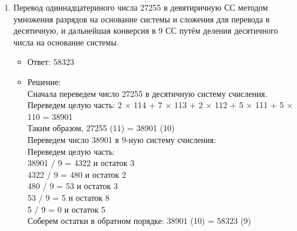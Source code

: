 \documentclass[14pt,final,oneside]{extreport}%
\begin{document}
\begin{enumerate}
        \item Перевод одиннадцатериного числа 27255 в девятиричную СС методом умножения разрядов на основание системы и сложения для перевода в десятичную, и дальнейшая конверсия в 9 СС путём деления десятичного числа на основание системы.
        \begin{itemize}
            \item Ответ: 58323
            \item Решение: \\
                Сначала переведем число 27255 в десятичную систему счисления. \\
                Переведем целую часть: 2 × 114 + 7 × 113 + 2 × 112 + 5 × 111 + 5 × 	110 = 38901 \\
                Таким образом, 27255 (11) = 38901 (10) \\
                Переведем число 38901 в 9-ную систему счисления: \\ 
                Переведем целую часть: \\
                38901 / 9 = 4322 и остаток 3 \\
                4322 / 9 = 480 и остаток 2 \\
                480 / 9 = 53 и остаток 3 \\
                53 / 9 = 5 и остаток 8 \\
                5 / 9 = 0 и остаток 5 \\
                Соберем остатки в обратном порядке: 38901 (10) = 58323 (9)
        \end{itemize}


\end{enumerate}
\end{document}
